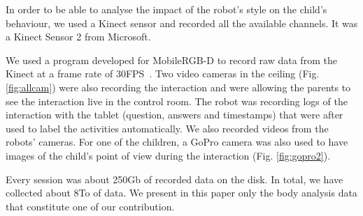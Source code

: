 \documentclass[a4paper,twocolumn]{svjour3}
\begin{document}
In order to be able to analyse the impact of the robot's style on the child's behaviour, we used a Kinect sensor and recorded all the available channels. 
It was a Kinect Sensor 2 from Microsoft. 

We used a program developed for MobileRGB-D to record raw data from the Kinect at a frame rate of 30FPS~\cite{MobileRGB}. 
Two video cameras in the ceiling (Fig. \ref{fig:allcam})  were also recording the interaction and were allowing the parents to see the interaction live in the control room. 
The robot was recording logs of the interaction with the tablet (question, answers and timestamps) that were after used to label the activities  automatically.  
We also recorded videos from the robots' cameras. 
For one of the children, a GoPro camera was also used to have images of the child's point of view during the interaction (Fig. \ref{fig:gopro2}).



%
%

 
Every session was about 250Gb of recorded data on the disk. 
In total, we have collected about 8To of data. 
We present in this paper only the body analysis data that constitute one of our contribution.
\end{document}
